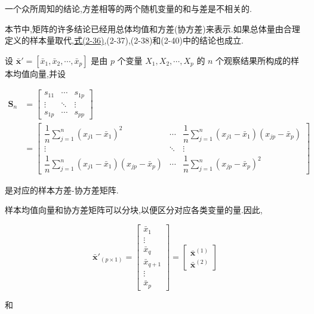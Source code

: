 
一个众所周知的结论,方差相等的两个随机变量的和与差是不相关的.


本节中,矩阵的许多结论已经用总体均值和方差(协方差)来表示.如果总体量由合理定义的样本量取代,\hyperref[eq:2-36]{式(2-36)},(2-37),(2-38)和(2-40)中的结论也成立.

设 $\bar{\bm{x}}' = [\bar{x}_1, \bar{x}_2, \cdots, \bar{x}_p]$ 是由 $p$ 个变量 $X_1, X_2, \cdots, X_p$ 的 $n$ 个观察结果所构成的样本均值向量,并设

\[
\begin{aligned}
\bm{S}_n &=
\begin{bmatrix}
s_{11} & \cdots & s_{1p} \\
\vdots & \ddots & \vdots \\
s_{1p} & \cdots & s_{pp}
\end{bmatrix} \\[4pt]
&=
\begin{bmatrix}
\dfrac{1}{n}\sum_{j=1}^{n}(x_{j1} - \bar{x}_1)^2 & \cdots & \dfrac{1}{n}\sum_{j=1}^{n}(x_{j1} - \bar{x}_1)(x_{jp} - \bar{x}_p) \\
\vdots & \ddots & \vdots \\
\dfrac{1}{n}\sum_{j=1}^{n}(x_{j1} - \bar{x}_1)(x_{jp} - \bar{x}_p) & \cdots & \dfrac{1}{n}\sum_{j=1}^{n}(x_{jp} - \bar{x}_p)^2
\end{bmatrix}
\end{aligned}
\]

是对应的样本方差-协方差矩阵.

样本均值向量和协方差矩阵可以分块,以便区分对应各类变量的量.因此,

\label{eq:2-46}
\begin{equation}
\bar{\bm{x}}'_{(p \times 1)} =
\begin{bmatrix}
\bar{x}_1 \\ \vdots \\ \bar{x}_q \\ \hline \bar{x}_{q+1} \\ \vdots \\ \bar{x}_p
\end{bmatrix}
=
\begin{bmatrix}
\bar{\bm{x}}^{(1)} \\ \hline \bar{\bm{x}}^{(2)}
\end{bmatrix} \tag{2-46}
\end{equation}

和

